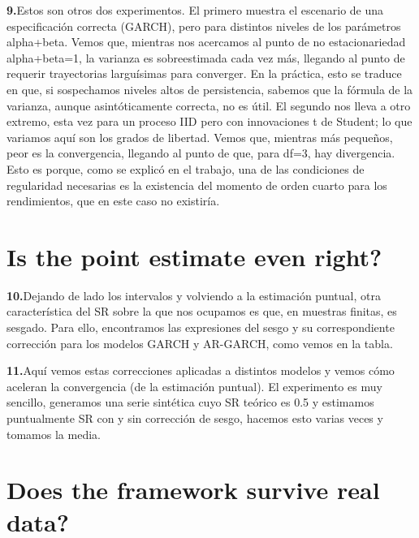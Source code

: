 \documentclass[11pt,a4paper]{article}
\newcommand{\seccionrule}{\vspace{-0.6em}{\color{accentblue}\hrule height 0.8pt}\vspace{0.8em}}
\newcommand{\diapo}[2]{%
  \par\medskip\noindent%
  \textbf{\textcolor{accentblue}{#1.}}\enspace #2\par\smallskip}
\begin{document}
\diapo{9}{Estos son otros dos experimentos. El primero muestra el
escenario de una especificación correcta (GARCH), pero para distintos
niveles de los parámetros alpha+beta. Vemos que, mientras nos acercamos
al punto de no estacionariedad alpha+beta=1, la varianza es sobreestimada
cada vez más, llegando al punto de requerir trayectorias larguísimas para
converger. En la práctica, esto se traduce en que, si sospechamos niveles
altos de persistencia, sabemos que la fórmula de la varianza, aunque
asintóticamente correcta, no es útil.
El segundo nos lleva a otro extremo, esta vez para un proceso IID pero
con innovaciones t de Student; lo que variamos aquí son los grados de
libertad. Vemos que, mientras más pequeños, peor es la convergencia,
llegando al punto de que, para df=3, hay divergencia. Esto es porque,
como se explicó en el trabajo, una de las condiciones de regularidad
necesarias es la existencia del momento de orden cuarto para los
rendimientos, que en este caso no existiría.}

\vspace{0.4em}
\seccionrule

\section*{Is the point estimate even right?}

\diapo{10}{Dejando de lado los intervalos y volviendo a la estimación
puntual, otra característica del SR sobre la que nos ocupamos es que, en
muestras finitas, es sesgado. Para ello, encontramos las expresiones del
sesgo y su correspondiente corrección para los modelos GARCH y AR-GARCH,
como vemos en la tabla.}

\diapo{11}{Aquí vemos estas correcciones aplicadas a distintos modelos y
vemos cómo aceleran la convergencia (de la estimación puntual). El experimento es muy sencillo, generamos una serie sintética cuyo SR teórico es 0.5 y estimamos puntualmente SR con y sin corrección de sesgo, hacemos esto varias veces y tomamos la media.}

\vspace{0.4em}
\seccionrule

\section*{Does the framework survive real data?}
\end{document}
